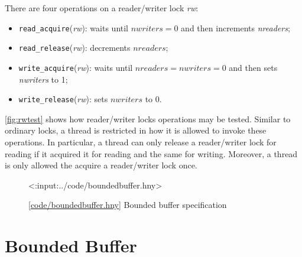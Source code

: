 \documentclass{report}
\newcommand{\harmonylink}[1]{%
[\href{https://harmony.cs.cornell.edu/#1}{\underline{#1}}]%
}
\newenvironment{code}{
\tcolorbox
}{
\endtcolorbox
}
\begin{document}
{There are four operations on a reader/writer lock \textit{rw}:
\begin{itemize}
\item \texttt{read\_acquire}(\textit{rw}): waits until $\mathit{nwriters} = 0$
and then increments \textit{nreaders};
\item \texttt{read\_release}(\textit{rw}): decrements $\mathit{nreaders}$;
\item \texttt{write\_acquire}(\textit{rw}): waits until
$\mathit{nreaders} = \mathit{nwriters} = 0$
and then sets \textit{nwriters} to 1;
\item \texttt{write\_release}(\textit{rw}): sets $\mathit{nwriters}$ to 0.
\end{itemize}

\autoref{fig:rwtest} shows how reader/writer locks operations
may be tested.
Similar to ordinary locks, a thread is restricted in how it is allowed to
invoke these operations.
In particular, a thread can only release a reader/writer lock for reading
if it acquired it for reading and the same for writing.
Moreover, a thread is only allowed the acquire a reader/writer lock once.

\begin{figure}
\begin{code}
<{:input:../code/boundedbuffer.hny}>
\end{code}
\caption{\harmonylink{code/boundedbuffer.hny} Bounded buffer specification}
\label{fig:boundedbuffer}
\end{figure}

\section{Bounded Buffer}
%
%
%

}
\end{document}
